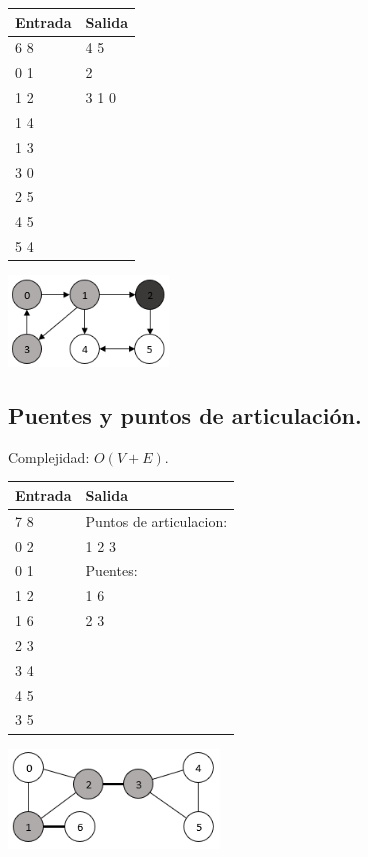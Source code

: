 \documentclass[12pt, letterpaper, twoside]{article}
\begin{document}
\begin{tabular}{|p{7cm}|p{7cm}|}
\hline
\textbf{Entrada} & \textbf{Salida}\\ \hline
6 8 & 4 5\\
0 1 & 2\\
1 2 & 3 1 0\\
1 4 & \\ 
1 3 & \\
3 0 & \\
2 5 & \\
4 5 & \\
5 4 & \\ \hline
\end{tabular}

\begin{center}
\includegraphics[width = 0.32\textwidth]{Grafos/Imagenes/StronglyConnected.png}
\end{center}

\subsection{Puentes y puntos de articulación.}

Complejidad: $O(V + E)$.



\begin{tabular}{|p{7cm}|p{7cm}|}
\hline
\textbf{Entrada} & \textbf{Salida}\\ \hline
7 8 & Puntos de articulacion:\\
0 2 & 1 2 3\\
0 1 & Puentes:\\
1 2 & 1 6\\ 
1 6 & 2 3\\
2 3 & \\
3 4 & \\
4 5 & \\
3 5 & \\ \hline
\end{tabular}

\begin{center}
\includegraphics[width = 0.42\textwidth]{Grafos/Imagenes/Bridge-Articulation.png}
\end{center}
\end{document}
